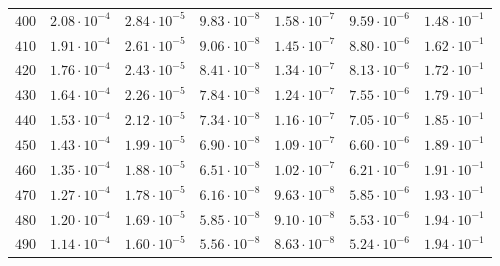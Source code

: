 \begin{table}
\begin{tabular}{lcccccc}
$400 $&$ 2.08\cdot 10^{-4}  $&$ 2.84\cdot 10^{-5}  $&$ 9.83\cdot 10^{-8}  $&$ 1.58\cdot 10^{-7}  $&$ 9.59\cdot 10^{-6}  $&$ 1.48\cdot 10^{-1}  $\\
$410 $&$ 1.91\cdot 10^{-4}  $&$ 2.61\cdot 10^{-5}  $&$ 9.06\cdot 10^{-8}  $&$ 1.45\cdot 10^{-7}  $&$ 8.80\cdot 10^{-6}  $&$ 1.62\cdot 10^{-1}  $\\
$420 $&$ 1.76\cdot 10^{-4}  $&$ 2.43\cdot 10^{-5}  $&$ 8.41\cdot 10^{-8}  $&$ 1.34\cdot 10^{-7}  $&$ 8.13\cdot 10^{-6}  $&$ 1.72\cdot 10^{-1}  $\\
$430 $&$ 1.64\cdot 10^{-4}  $&$ 2.26\cdot 10^{-5}  $&$ 7.84\cdot 10^{-8}  $&$ 1.24\cdot 10^{-7}  $&$ 7.55\cdot 10^{-6}  $&$ 1.79\cdot 10^{-1}  $\\
$440 $&$ 1.53\cdot 10^{-4}  $&$ 2.12\cdot 10^{-5}  $&$ 7.34\cdot 10^{-8}  $&$ 1.16\cdot 10^{-7}  $&$ 7.05\cdot 10^{-6}  $&$ 1.85\cdot 10^{-1}  $\\
$450 $&$ 1.43\cdot 10^{-4}  $&$ 1.99\cdot 10^{-5}  $&$ 6.90\cdot 10^{-8}  $&$ 1.09\cdot 10^{-7}  $&$ 6.60\cdot 10^{-6}  $&$ 1.89\cdot 10^{-1}  $\\
$460 $&$ 1.35\cdot 10^{-4}  $&$ 1.88\cdot 10^{-5}  $&$ 6.51\cdot 10^{-8}  $&$ 1.02\cdot 10^{-7}  $&$ 6.21\cdot 10^{-6}  $&$ 1.91\cdot 10^{-1}  $\\
$470 $&$ 1.27\cdot 10^{-4}  $&$ 1.78\cdot 10^{-5}  $&$ 6.16\cdot 10^{-8}  $&$ 9.63\cdot 10^{-8}  $&$ 5.85\cdot 10^{-6}  $&$ 1.93\cdot 10^{-1}  $\\
$480 $&$ 1.20\cdot 10^{-4}  $&$ 1.69\cdot 10^{-5}  $&$ 5.85\cdot 10^{-8}  $&$ 9.10\cdot 10^{-8}  $&$ 5.53\cdot 10^{-6}  $&$ 1.94\cdot 10^{-1}  $\\
$490 $&$ 1.14\cdot 10^{-4}  $&$ 1.60\cdot 10^{-5}  $&$ 5.56\cdot 10^{-8}  $&$ 8.63\cdot 10^{-8}  $&$ 5.24\cdot 10^{-6}  $&$ 1.94\cdot 10^{-1}  $\\
\hline
  \end{tabular}
\end{table}

